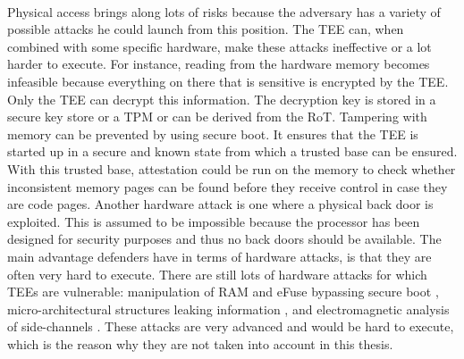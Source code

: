 \paragraph*{}
Physical access brings along lots of risks because the adversary has a variety of possible attacks he could launch from this position. The TEE can, when combined with some specific hardware, make these attacks ineffective or a lot harder to execute. For instance, reading from the hardware memory becomes infeasible because everything on there that is sensitive is encrypted by the TEE. Only the TEE can decrypt this information. The decryption key is stored in a secure key store or a TPM or can be derived from the RoT. Tampering with memory can be prevented by using secure boot. It ensures that the TEE is started up in a secure and known state from which a trusted base can be ensured. With this trusted base, attestation could be run on the memory to check whether inconsistent memory pages can be found before they receive control in case they are code pages. Another hardware attack is one where a physical back door is exploited. This is assumed to be impossible because the processor has been designed for security purposes and thus no back doors should be available. The main advantage defenders have in terms of hardware attacks, is that they are often very hard to execute. There are still lots of hardware attacks for which TEEs are vulnerable: manipulation of RAM and eFuse bypassing secure boot \cite{GrossMathieu2021BTmi}, micro-architectural structures leaking information \cite{RyanKeegan2019HHEE}, and electromagnetic analysis of side-channels \cite{BukasaSebanjilaKevin2018HTCB}. These attacks are very advanced and would be hard to execute, which is the reason why they are not taken into account in this thesis.

